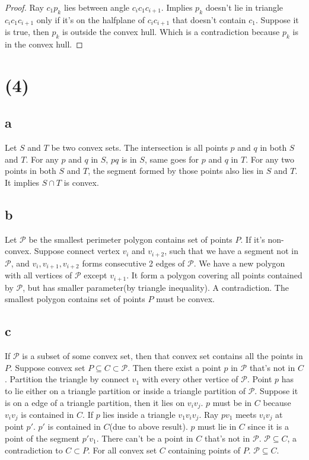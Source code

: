 \documentclass[letter]{article}
\begin{document}
\begin{proof}
Ray $c_1p_k$ lies between angle $c_ic_1c_{i+1}$. Implies $p_k$ doesn't lie in
triangle $c_ic_1c_{i+1}$
only if it's on the halfplane of $c_ic_{i+1}$ that doesn't contain $c_1$.
Suppose it
is true, then $p_k$ is outside the convex hull. Which is a contradiction because
$p_k$ is in the convex hull.
\end{proof}

\section*{(4)}
\subsection*{a}
Let $S$ and $T$ be two convex sets. The intersection is all points $p$ and $q$
in both $S$ 
and $T$. For any $p$ and $q$ in $S$, $pq$ is in $S$, 
same goes for $p$ and $q$ in $T$. For any two points in both $S$ and $T$, 
the segment formed by those points also lies in $S$ and $T$.
It implies $S \cap T$ is convex.

\subsection*{b}
Let $\mathcal{P}$ be the smallest perimeter polygon contains set of points $P$. If it's
non-convex. Suppose connect vertex $v_i$ and $v_{i+2}$, such that we have a
segment not in
$\mathcal{P}$, and $v_i,v_{i+1},v_{i+2}$ forms consecutive 2 edges of $\mathcal{P}$.
We have a new polygon with all vertices of $\mathcal{P}$ except $v_{i+1}$. It form a polygon
covering all points contained by $\mathcal{P}$, but has smaller parameter(by
triangle inequality).
A contradiction. The smallest polygon contains set of points $P$ must be convex.

\subsection*{c}
If $\mathcal{P}$ is a subset of some convex set, then that convex set contains
all
the points in $P$. Suppose convex set $P \subseteq C\subset \mathcal{P}$. Then there exist a point $p$
in 
$\mathcal{P}$ that's not in $C$. Partition the triangle by connect $v_1$ with
every
other vertice of $\mathcal{P}$. Point $p$ has to lie either on a triangle
partition
or inside a triangle partition of $\mathcal{P}$. Suppose it is on a edge of a
triangle
partition, then it lies on $v_iv_j$. $p$ must be in $C$ because $v_iv_j$ is
contained in
$C$. If $p$ lies inside a triangle $v_1v_iv_j$.
Ray $pv_1$ meets $v_iv_j$ at point $p'$. $p'$ is contained in $C$(due to above
result).
$p$ must lie in $C$ since it is a point of the segment $p'v_1$.
There can't be a point in $C$ that's not in $\mathcal{P}$. $\mathcal{P} \subseteq C$, a contradiction to $C \subset P$. For all convex
set $C$ containing points of $P$. $\mathcal{P}\subseteq C$.
\end{document}
